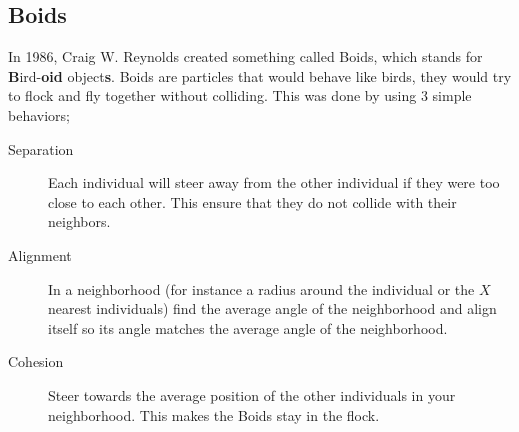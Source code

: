 \subsection{Boids}
In 1986, Craig W. Reynolds created something called Boids, which stands for \textbf{B}ird-\textbf{oid} object\textbf{s}. Boids are particles that would behave like birds, they would try to flock and fly together without colliding. This was done by using 3 simple behaviors;
\begin{description}
    \item[Separation]
        Each individual will steer away from the other individual if they were too close to each other. This ensure that they do not collide with their neighbors.
    \item[Alignment]
        In a neighborhood (for instance a radius around the individual or the $X$ nearest individuals) find the average angle of the neighborhood and align itself so its angle matches the average angle of the neighborhood.
    \item[Cohesion]
        Steer towards the average position of the other individuals in your neighborhood. This makes the Boids stay in the flock.
\end{description}
